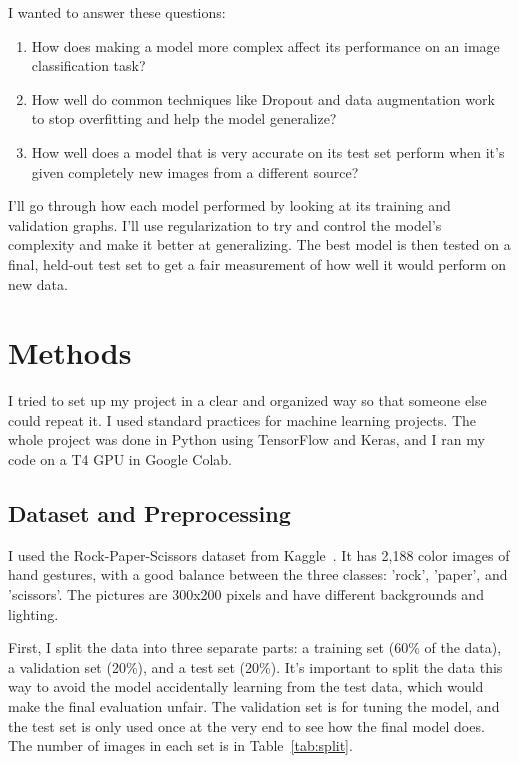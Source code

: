 \documentclass[pdflatex,sn-mathphys-num]{sn-jnl}%
\theoremstyle{thmstyleone}%
\theoremstyle{thmstyletwo}%
\theoremstyle{thmstylethree}%
\begin{document}
I wanted to answer these questions:
\begin{enumerate}
    \item How does making a model more complex affect its performance on an image classification task?
    \item How well do common techniques like Dropout and data augmentation work to stop overfitting and help the model generalize?
    \item How well does a model that is very accurate on its test set perform when it's given completely new images from a different source?
\end{enumerate}

I'll go through how each model performed by looking at its training and validation graphs. I'll use regularization to try and control the model's complexity and make it better at generalizing. The best model is then tested on a final, held-out test set to get a fair measurement of how well it would perform on new data.

\section{Methods}\label{sec11}

I tried to set up my project in a clear and organized way so that someone else could repeat it. I used standard practices for machine learning projects. The whole project was done in Python using TensorFlow and Keras, and I ran my code on a T4 GPU in Google Colab.

\subsection{Dataset and Preprocessing}
I used the Rock-Paper-Scissors dataset from Kaggle~\cite{kaggle_rps}. It has 2,188 color images of hand gestures, with a good balance between the three classes: 'rock', 'paper', and 'scissors'. The pictures are 300x200 pixels and have different backgrounds and lighting.

First, I split the data into three separate parts: a training set (60\% of the data), a validation set (20\%), and a test set (20\%). It's important to split the data this way to avoid the model accidentally learning from the test data, which would make the final evaluation unfair. The validation set is for tuning the model, and the test set is only used once at the very end to see how the final model does. The number of images in each set is in Table~\ref{tab:split}.
\end{document}
